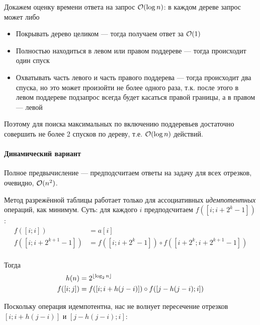 Докажем оценку времени ответа на запрос $\mathcal{O}(\log n)$:
в каждом дереве запрос может либо
\begin{itemize}
    \item Покрывать дерево целиком
    --- тогда получаем ответ за $\mathcal{O}(1)$

    \item Полностью находиться в
    левом или правом поддереве
    --- тогда происходит один спуск

    \item Охватывать часть левого и часть правого поддерева
    --- тогда происходит два спуска,
    но это может произойти не более одного раза,
    т.к. после этого в левом поддереве
    подзапрос всегда будет касаться правой границы,
    а в правом --- левой
\end{itemize}

Поэтому для поиска максимальных по включению поддеревьев
достаточно совершить не более 2 спусков по дереву,
т.е. $\mathcal{O}(\log n)$ действий.

\paragraph{Динамический вариант}
Полное предвычисление --- предподсчитаем ответы
на задачу для всех отрезков, очевидно, $\mathcal{O}(n^2)$.

Метод разрежённой таблицы работает только для ассоциативных
\emph{идемпотентных} операций, как минимум.
Суть: для каждого $i$ предподсчитаем $f([i; i + 2^k - 1])$:
\begin{align*}
    f([i; i]) & = a[i] \\
    f([i; i + 2^{k + 1} - 1]) & = f([i; i + 2^k - 1]) \circ f([i + 2^k; i + 2^{k + 1} - 1]) \\
\end{align*}

Тогда
\begin{align*}
    h(n) & = 2^{\left \lfloor \log_2 n \right \rfloor} \\
    f([i; j]) & = f([i; i + h(j - i)]) \circ f([j - h(j - i); i]) \\
\end{align*}

Поскольку операция идемпотентна, нас не волнует пересечение
отрезков ${[i; i + h(j - i)]}$ и ${[j - h(j - i); i]}$:
\begin{center}
\end{center}

